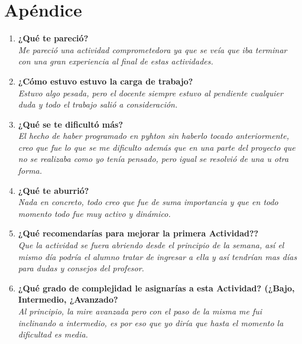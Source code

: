 ﻿\documentclass[12pt]{article}
\begin{document}
\section{Apéndice}
\begin{enumerate}
\item \textbf{¿Qué te pareció?}\\
\textit{Me pareció una actividad comprometedora ya que se veía que iba terminar con una gran experiencia al final de estas actividades.}

\item \textbf{¿Cómo estuvo estuvo la carga de trabajo?} \\
\textit{Estuvo algo pesada, pero el docente siempre estuvo al pendiente cualquier duda y todo el trabajo salió a consideración.}

\item \textbf{¿Qué se te dificultó más?}\\
\textit{El hecho de haber programado en pyhton sin haberlo tocado anteriormente, creo que fue lo que se me dificulto además que en una parte del proyecto que no se realizaba como yo tenía pensado, pero igual se resolvió de una u otra forma.}

\item \textbf{¿Qué te aburrió?}\\
\textit{Nada en concreto, todo creo que fue de suma importancia y que en todo momento todo fue muy activo y dinámico.}

\item \textbf{¿Qué recomendarías para mejorar la primera Actividad?? }\\
\textit{Que la actividad se fuera abriendo desde el principio de la semana, así el mismo día podría el alumno tratar de ingresar a ella y así tendrían mas días para dudas y consejos del profesor.}

\item \textbf{¿Qué grado de complejidad le asignarías a esta Actividad? (¿Bajo, Intermedio, ¿Avanzado?} \\
\textit{Al principio, la mire avanzada pero con el paso de la misma me fui inclinando a intermedio, es por eso que yo diría que hasta el momento la dificultad es media.}

\end{enumerate}
\end{document}
